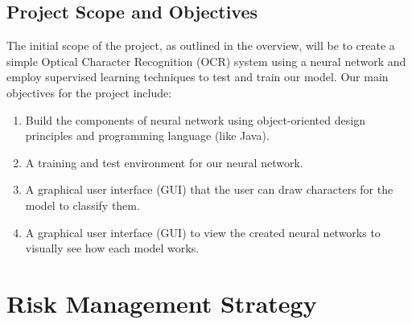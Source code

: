 \documentclass[english,12pt]{article}
\begin{document}
\subsection{Project Scope and Objectives}
The initial scope of the project, as outlined in the overview, will be to create a simple Optical Character Recognition (OCR) system using a neural network and employ supervised learning techniques to test and train our model. Our main objectives for the project include:
\begin{enumerate}[(a.)]
  \item Build the components of neural network using object-oriented design principles and programming language (like Java).
  \item A training and test environment for our neural network.
  \item A graphical user interface (GUI) that the user can draw characters
    for the model to classify them.
  \item A graphical user interface (GUI) to view the created neural networks to
    visually see how each model works.
\end{enumerate}

\section{Risk Management Strategy}
\end{document}
